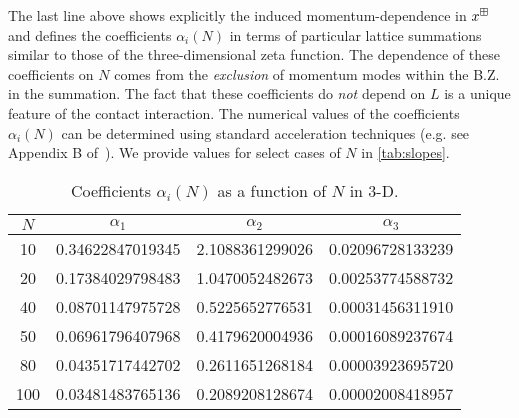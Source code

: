 The last line above shows explicitly the induced momentum-dependence in $x^\boxplus$ and defines the coefficients $\alpha_i(N)$ in terms of particular lattice summations similar to those of the three-dimensional zeta function.  The dependence of these coefficients on $N$ comes from the \emph{exclusion} of momentum modes within the B.Z. in the summation.   The fact that these coefficients do \emph{not} depend on $L$ is a unique feature of the contact interaction.  The numerical values of the coefficients $\alpha_i(N)$ can be determined using standard acceleration techniques (e.g. see Appendix B of~\cite{Luu:2011ep}).  We provide values for select cases of $N$ in \autoref{tab:slopes}.
\begin{table}
\caption{Coefficients $\alpha_i(N)$ as a function of $N$ in 3-D.\label{tab:slopes}}
\center
\begin{tabular}{c|ccc}
$N$ & $\alpha_1$ & $\alpha_2$ & $\alpha_3$ \\
\hline
10 & 0.34622847019345 &2.1088361299026 &0.02096728133239\\
20 & 0.17384029798483 &1.0470052482673 &0.00253774588732\\
40 & 0.08701147975728 &0.5225652776531 &0.00031456311910\\
50 & 0.06961796407968 &0.4179620004936 &0.00016089237674\\
80 & 0.04351717442702 &0.2611651268184 &0.00003923695720\\
100 &0.03481483765136 &0.2089208128674 &0.00002008418957
\end{tabular}
\end{table}
